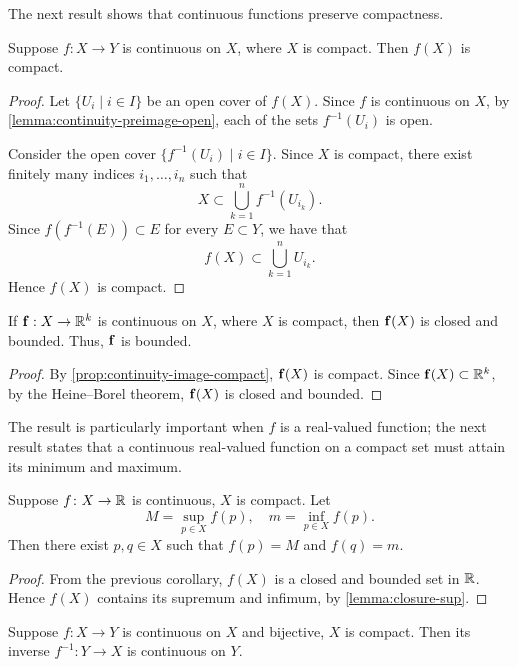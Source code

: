 The next result shows that continuous functions preserve compactness.

\begin{proposition}\label{prop:continuity-image-compact}
Suppose $f\colon X\to Y$ is continuous on $X$, where $X$ is compact. Then $f(X)$ is compact.
\end{proposition}

\begin{proof}
Let $\{U_i\mid i\in I\}$ be an open cover of $f(X)$. Since $f$ is continuous on $X$, by \ref{lemma:continuity-preimage-open}, each of the sets $f^{-1}(U_i)$ is open.

Consider the open cover $\{f^{-1}(U_i)\mid i\in I\}$. Since $X$ is compact, there exist finitely many indices $i_1,\dots,i_n$ such that
\[X\subset\bigcup_{k=1}^{n}f^{-1}(U_{i_k}).\]
Since $f(f^{-1}(E))\subset E$ for every $E\subset Y$, we have that
\[f(X)\subset\bigcup_{k=1}^{n}U_{i_k}.\]
Hence $f(X)$ is compact.
\end{proof}

\begin{corollary}
If $\vb{f}:X\to\mathbb R^k$ is continuous on $X$, where $X$ is compact, then $\vb{f}(X)$ is closed and bounded. Thus, $\vb{f}$ is bounded.
\end{corollary}

\begin{proof}
By \ref{prop:continuity-image-compact}, $\vb{f}(X)$ is compact. Since $\vb{f}(X)\subset\mathbb R^k$, by the Heine--Borel theorem, $\vb{f}(X)$ is closed and bounded.
\end{proof}

The result is particularly important when $f$ is a real-valued function; the next result states that a continuous real-valued function on a compact set must attain its minimum and maximum. 

\begin{theorem}\label{thrm:extreme-value}
Suppose $f\colon X\to\mathbb R$ is continuous, $X$ is compact. Let
\[M=\sup_{p\in X}f(p),\quad m=\inf_{p\in X}f(p).\]
Then there exist $p,q\in X$ such that $f(p)=M$ and $f(q)=m$.
\end{theorem}

\begin{proof}
From the previous corollary, $f(X)$ is a closed and bounded set in $\mathbb R$. Hence $f(X)$ contains its supremum and infimum, by \ref{lemma:closure-sup}.
\end{proof}

\begin{proposition}
Suppose $f\colon X\to Y$ is continuous on $X$ and bijective, $X$ is compact. Then its inverse $f^{-1}:Y\to X$ is continuous on $Y$.
\end{proposition}


